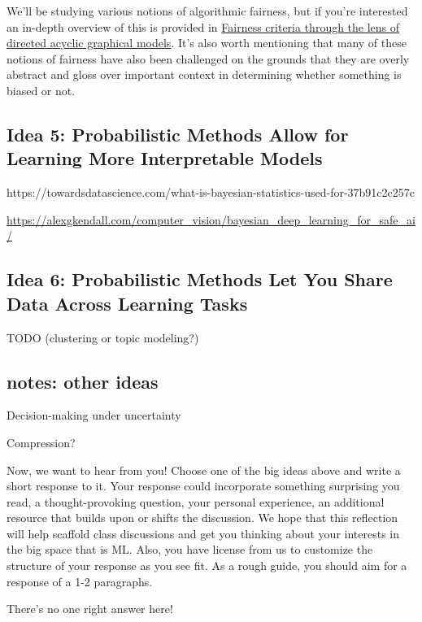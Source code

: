 \documentclass[assignment01_Solutions]{subfiles}
\begin{document}
We'll be studying various notions of algorithmic fairness, but if you're interested an in-depth overview of this is provided in \href{https://arxiv.org/pdf/1906.11333.pdf}{Fairness criteria through the lens of directed acyclic graphical models}.  It's also worth mentioning that many of these notions of fairness have also been challenged on the grounds that they are overly abstract and gloss over important context in determining whether something is biased or not.


\subsection*{Idea 5: Probabilistic Methods Allow for Learning More Interpretable Models}

https://towardsdatascience.com/what-is-bayesian-statistics-used-for-37b91c2c257c


\url{https://alexgkendall.com/computer_vision/bayesian_deep_learning_for_safe_ai/}

\subsection*{Idea 6: Probabilistic Methods Let You Share Data Across Learning Tasks}
TODO (clustering or topic modeling?)


\subsection*{notes: other ideas}
\bi
\item Decision-making under uncertainty
\item Compression?
\ei

\begin{exercise}
Now, we want to hear from you!  
Choose one of the big ideas above and write a short response to it.  Your response could incorporate something surprising you read, a thought-provoking question, your personal experience, an additional resource that builds upon or shifts the discussion.  We hope that this reflection will help scaffold class discussions and get you thinking about your interests in the big space that is ML.  Also, you have license from us to customize the structure of your response as you see fit.  As a rough guide, you should aim for a response of a 1-2 paragraphs.

\begin{boxedsolution}
There's no one right answer here!
\end{boxedsolution}
\end{exercise}
\end{document}
